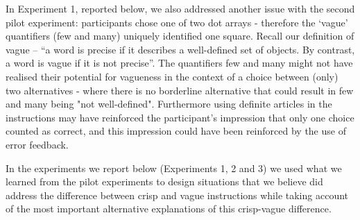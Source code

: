 In Experiment 1, reported below, we also addressed another issue with the second pilot experiment: participants chose one of two dot arrays - therefore the `vague' quantifiers (few and many) uniquely identified one square. Recall our definition of vague  -- ``a word is precise if it describes a well-defined set of objects. By contrast, a word is vague if it is not precise''. The quantifiers few and many might not have realised their potential for vagueness in the context of a choice between (only) two alternatives - where there is no borderline alternative that could result in few and many being "not well-defined". Furthermore using definite articles in the instructions may have reinforced the participant's impression that only one choice counted as correct, and this impression could have been reinforced by the use of error feedback.

In the experiments we report below (Experiments 1, 2 and 3) we used what we learned from the pilot experiments to design situations that we believe did address the difference between crisp and vague instructions while taking account of the most important alternative explanations of this crisp-vague difference.



